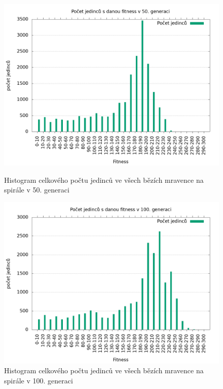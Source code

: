 \begin{figure}[h]
    \begin{minipage}[c]{0.48\linewidth}
        \includegraphics[width=\linewidth]{obrazky/mravenec_spirala_fitnessHistogram50.png}
        \caption{Histogram celkového počtu jedinců ve všech bězích mravence na spirále v 50. generaci}
        \label{fig:mravenec_spirala_histogram_50}
    \end{minipage}
    \hfill
    \begin{minipage}[c]{0.48\linewidth}
        \includegraphics[width=\linewidth]{obrazky/mravenec_spirala_fitnessHistogram100.png}
        \caption{Histogram celkového počtu jedinců ve všech bězích mravence na spirále v 100. generaci}
        \label{fig:mravenec_spirala_histogram_100}
    \end{minipage}
\end{figure}

